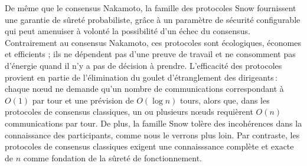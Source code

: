 \documentclass[letterpaper,twocolumn,10pt]{article}
\newcommand{\Oh}[1]{O(#1)}
\theoremstyle{definition}
\begin{document}
De même que le consensus Nakamoto, la famille des protocoles Snow fournissent une garantie de sûreté probabiliste, grâce à un paramètre de sécurité configurable qui peut amenuiser à volonté la possibilité d'un échec du consensus.
Contrairement au consensus Nakamoto, ces protocoles sont écologiques, économes et efficients ; ils ne dépendent pas d'une preuve de travail\cite{DworkN92} et ne consomment pas d'énergie quand il n'y a pas de décision à prendre.
L'efficacité des protocoles provient en partie de l'élimination du goulet d'étranglement des dirigeants\,: chaque nœud ne demande qu'un nombre de communications correspondant à $\Oh{1}$ par tour et une prévision de $\Oh{\log{n}}$ tours, alors que, dans les protocoles de consensus classiques, un ou plusieurs nœuds requièrent $\Oh{n}$ communications par tour.
De plus, la famille Snow tolère des incohérences dans la connaissance des participants, comme nous le verrons plus loin. Par contraste, les protocoles de consensus classiques exigent une connaisssance complète et exacte de $n$ comme fondation de la sûreté de fonctionnement.
\end{document}
